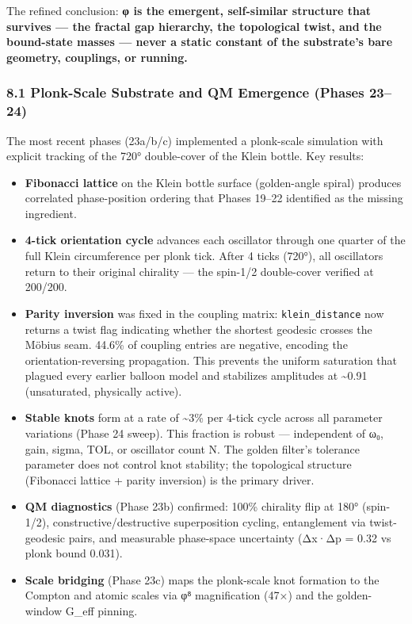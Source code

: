 \documentclass[
]{article}
\providecommand{\tightlist}{%
  \setlength{\itemsep}{0pt}\setlength{\parskip}{0pt}}
\begin{document}
The refined conclusion: \textbf{φ is the emergent, self-similar
structure that survives --- the fractal gap hierarchy, the topological
twist, and the bound-state masses --- never a static constant of the
substrate's bare geometry, couplings, or running.}

\subsubsection{8.1 Plonk-Scale Substrate and QM Emergence (Phases
23--24)}\label{plonk-scale-substrate-and-qm-emergence-phases-2324}

The most recent phases (23a/b/c) implemented a plonk-scale simulation
with explicit tracking of the 720° double-cover of the Klein bottle. Key
results:

\begin{itemize}
\tightlist
\item
  \textbf{Fibonacci lattice} on the Klein bottle surface (golden-angle
  spiral) produces correlated phase-position ordering that Phases 19--22
  identified as the missing ingredient.
\item
  \textbf{4-tick orientation cycle} advances each oscillator through one
  quarter of the full Klein circumference per plonk tick. After 4 ticks
  (720°), all oscillators return to their original chirality --- the
  spin-1/2 double-cover verified at 200/200.
\item
  \textbf{Parity inversion} was fixed in the coupling matrix:
  \texttt{klein\_distance} now returns a twist flag indicating whether
  the shortest geodesic crosses the Möbius seam. 44.6\% of coupling
  entries are negative, encoding the orientation-reversing propagation.
  This prevents the uniform saturation that plagued every earlier
  balloon model and stabilizes amplitudes at \textasciitilde0.91
  (unsaturated, physically active).
\item
  \textbf{Stable knots} form at a rate of \textasciitilde3\% per 4-tick
  cycle across all parameter variations (Phase 24 sweep). This fraction
  is robust --- independent of ω₀, gain, sigma, TOL, or oscillator count
  N. The golden filter's tolerance parameter does not control knot
  stability; the topological structure (Fibonacci lattice + parity
  inversion) is the primary driver.
\item
  \textbf{QM diagnostics} (Phase 23b) confirmed: 100\% chirality flip at
  180° (spin-1/2), constructive/destructive superposition cycling,
  entanglement via twist-geodesic pairs, and measurable phase-space
  uncertainty (Δx·Δp = 0.32 vs plonk bound 0.031).
\item
  \textbf{Scale bridging} (Phase 23c) maps the plonk-scale knot
  formation to the Compton and atomic scales via φ⁸ magnification (47×)
  and the golden-window G\_eff pinning.
\end{itemize}
\end{document}

